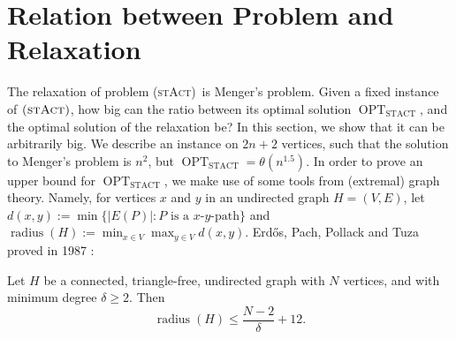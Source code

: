 \documentclass[runningheads]{llncs}
\numberwithin{equation}{section}
\newcommand{\set}[1]{\{ #1 \}}
\newcommand{\stact}{\textsc{(stAct)}}
\DeclareMathOperator{\radius}{\text{radius}}
\DeclareMathOperator{\opt}{OPT}
\newcommand{\optDirStAct}{\opt_\text{STACT}}
\begin{document}
\section{Relation between Problem and Relaxation}
\label{sec:ratio_relaxation}
The relaxation of problem \stact\ is Menger's problem. Given a fixed instance of $\stact$, how big can the ratio between its optimal solution $\optDirStAct$, and the optimal solution of the relaxation be? In this section, we show that it can be arbitrarily big. We describe an instance on $2n+2$ vertices, such that the solution to Menger's problem is $n^2$, but  $\optDirStAct = \theta(n^{1.5})$. In order to prove an upper bound for $\optDirStAct$, we make use of some tools from (extremal) graph theory. Namely, for vertices $x$ and $y$ in an undirected graph $H = (V, E)$, let $d(x, y) := \min\set{ |E(P)| : P \text{ is a $x$-$y$-path}}$ and $\radius(H) := \min_{x \in V} \max_{y \in V} d(x, y)$. Erd\H{o}s, Pach, Pollack and Tuza proved in 1987 \cite{erdHos1989radius}:
\begin{theorem}
\label{thm_mindegree_diameter_erdos}
Let $H$ be a connected, triangle-free, undirected graph with $N$ vertices, and with minimum degree $\delta \geq 2$. Then
\[\radius(H) \leq \frac{N-2}{\delta} + 12.\] 
\end{theorem}
\end{document}
